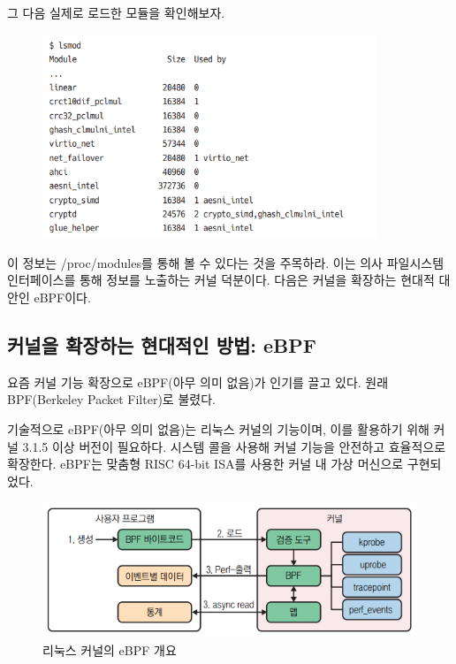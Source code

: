 \begin{flushleft}
    그 다음 실제로 로드한 모듈을 확인해보자.
\end{flushleft}

\begin{figure}[h]
    \includegraphics[width=10cm]{resource/module-2.png}
\end{figure}

\begin{flushleft}
    이 정보는 /proc/modules를 통해 볼 수 있다는 것을 주목하라.
    이는 의사 파일시스템 인터페이스를 통해 정보를 노출하는 커널 덕분이다.
    다음은 커널을 확장하는 현대적 대안인 eBPF이다.
\end{flushleft}

\subsection*{커널을 확장하는 현대적인 방법: eBPF}
\begin{flushleft}
    요즘 커널 기능 확장으로 eBPF(아무 의미 없음)가 인기를 끌고 있다.
    원래 BPF(Berkeley Packet Filter)로 불렸다.
\end{flushleft}

\begin{flushleft}
    기술적으로 eBPF(아무 의미 없음)는 리눅스 커널의 기능이며,
    이를 활용하기 위해 커널 3.1.5 이상 버전이 필요하다.
    시스템 콜을 사용해 커널 기능을 안전하고 효율적으로 확장한다.
    eBPF는 맞춤형 RISC 64-bit ISA를 사용한 커널 내 가상 머신으로 구현되었다.
\end{flushleft}

\begin{figure}[h]
    \centering
    \includegraphics[width=15cm]{resource/2-5.png}
    \caption{리눅스 커널의 eBPF 개요}
\end{figure}
\newpage

